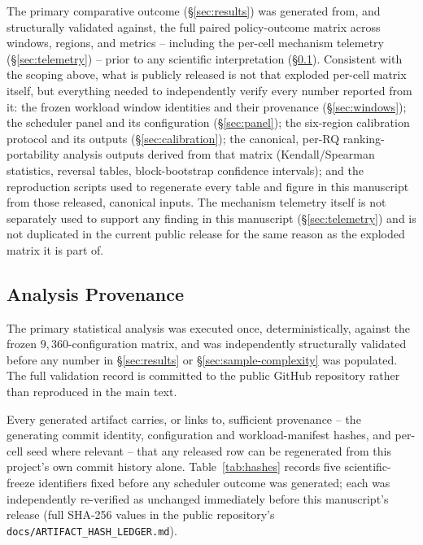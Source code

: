 The primary comparative outcome (\S\ref{sec:results}) was generated from,
and structurally validated against, the full paired policy-outcome matrix
across windows, regions, and metrics -- including the per-cell mechanism
telemetry (\S\ref{sec:telemetry}) -- prior to any scientific
interpretation (\S\ref{sec:artifact-hashes}). Consistent with the scoping above,
what is publicly released is not that exploded per-cell matrix itself, but
everything needed to independently verify every number reported from it:
the frozen workload window identities and their provenance
(\S\ref{sec:windows}); the scheduler panel and its configuration
(\S\ref{sec:panel}); the six-region calibration protocol and its outputs
(\S\ref{sec:calibration}); the canonical, per-RQ ranking-portability
analysis outputs derived from that matrix (Kendall/Spearman statistics,
reversal tables, block-bootstrap confidence intervals); and the
reproduction scripts used to regenerate every table and figure in this
manuscript from those released, canonical inputs. The mechanism telemetry
itself is not separately used to support any finding in this manuscript
(\S\ref{sec:telemetry}) and is not duplicated in the current public
release for the same reason as the exploded matrix it is part of.

\subsection{Analysis Provenance}
\label{sec:artifact-hashes}

The primary statistical analysis was executed once, deterministically,
against the frozen $9{,}360$-configuration matrix, and was independently
structurally validated before any number in \S\ref{sec:results} or
\S\ref{sec:sample-complexity} was populated. The full validation record is
committed to the public GitHub repository rather than reproduced in the
main text.

Every generated artifact carries, or links to, sufficient provenance --
the generating commit identity, configuration and workload-manifest
hashes, and per-cell seed where relevant -- that any released row can be
regenerated from this project's own commit history alone. Table~\ref{tab:hashes}
records five scientific-freeze identifiers fixed before any scheduler
outcome was generated; each was independently re-verified as unchanged
immediately before this manuscript's release (full SHA-256 values in the
public repository's \texttt{docs/ARTIFACT\_HASH\_LEDGER.md}).

